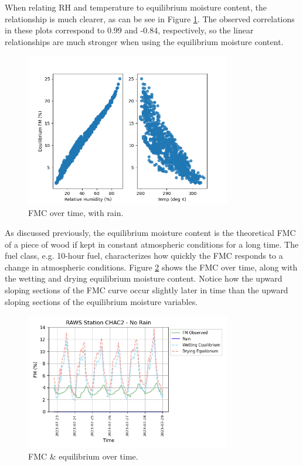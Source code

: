\documentclass[11pt]{article}%
\begin{document}
When relating RH and temperature to equilibrium moisture content, the relationship is much clearer, as can be see in Figure \ref{fig:ep_rh_temp_plot}. The observed correlations in these plots correspond to 0.99 and -0.84, respectively, so the linear relationships are much stronger when using the equilibrium moisture content.

\begin{figure}[ht]
    \centering
    \includegraphics[width=0.8\textwidth]{images/eq_rh_temp_plot.png}
    \caption{FMC over time, with rain.}
    \label{fig:ep_rh_temp_plot}
\end{figure}

As discussed previously, the equilibrium moisture content is the theoretical FMC of a piece of wood if kept in constant atmospheric conditions for a long time. The fuel class, e.g. 10-hour fuel, characterizes how quickly the FMC responds to a change in atmospheric conditions. Figure \ref{fig:eq_plot} shows the FMC over time, along with the wetting and drying equilibrium moisture content. Notice how the upward sloping sections of the FMC curve occur slightly later in time than the upward sloping sections of the equilibrium moisture variables. 

\begin{figure}[ht]
    \centering
    \includegraphics[width=0.8\textwidth]{images/eq_plot.png}
    \caption{FMC \& equilibrium over time.}
    \label{fig:eq_plot}
\end{figure}
\end{document}
